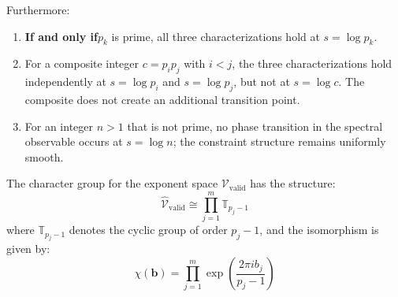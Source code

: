 \begin{theorem}
\begin{enumerate}
\end{enumerate}

Furthermore:
\begin{enumerate}
\item \textbf{If and only if}$p_k$ is prime, all three characterizations hold at $s = \log p_k$.
\item For a composite integer $c = p_i p_j$ with $i < j$, the three characterizations hold independently at $s = \log p_i$ and $s = \log p_j$, but not at $s = \log c$. The composite does not create an additional transition point.
\item For an integer $n > 1$ that is not prime, no phase transition in the spectral observable occurs at $s = \log n$; the constraint structure remains uniformly smooth.
\end{enumerate}
\end{theorem}

\begin{lemma}
\label{lem:character-group-structure}
The character group for the exponent space $\mathcal{V}_{\text{valid}}$ has the structure:
\begin{equation}
\hat{\mathcal{V}}_{\text{valid}} \cong \prod_{j=1}^m \mathbb{T}_{p_j-1}
\end{equation}
where $\mathbb{T}_{p_j-1}$ denotes the cyclic group of order $p_j - 1$, and the isomorphism is given by:
\begin{equation}
\chi(\mathbf{b}) = \prod_{j=1}^m \exp\left(\frac{2\pi i b_j}{p_j - 1}\right)
\end{equation}
\end{lemma}

